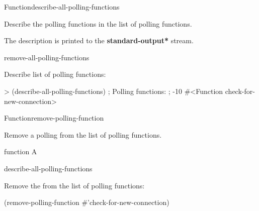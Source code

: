 \documentclass[10pt,twoside,english,pdftex]{article}
\begin{document}

\begin{functiondoc}{Function}{describe-all-polling-functions}{\noargs}
%
%

\fnsyntax 

\fnpurpose Describe the polling functions in the list of polling functions.

\fnpackage {}

\fnmodule {}

\fndescription
{}%
The description is printed to the {\bf *standard-output*} stream.

\begin{alsos}{remove-all-polling-functions}
\end{alsos}

\fnexample
Describe list of polling functions:
\begin{example}
> (describe-all-polling-functions)
; Polling functions:
;    -10 #<Function check-for-new-connection>
\end{example}

\end{functiondoc}


\begin{functiondoc}{Function}{remove-polling-function}{}
%

\fnsyntax 

\fnpurpose Remove a polling  from the list of polling functions.

\fnpackage {}

\fnmodule {}

\fnargs
\begin{args}{function}
\arg[function] A 
\end{args}

\begin{alsos}{describe-all-polling-functions}
\end{alsos}

\fnexample
Remove the   from the list of polling 
functions:
\begin{example}
  (remove-polling-function #'check-for-new-connection)
\end{example}

\end{functiondoc}
\end{document}
